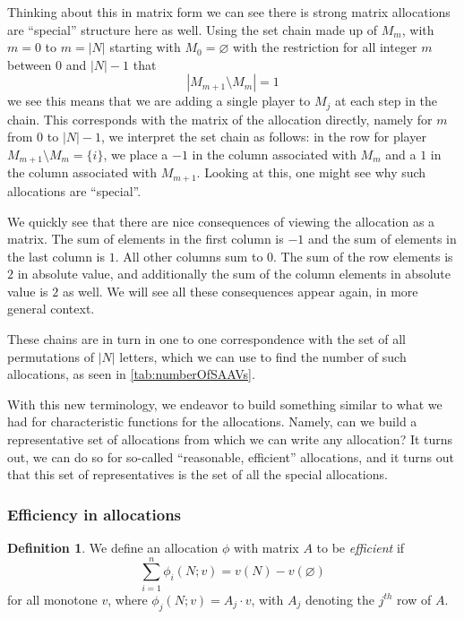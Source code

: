 \documentclass[12pt,letterpaper,final]{article}
\theoremstyle{plain}
\theoremstyle{plain}
\theoremstyle{plain}
\theoremstyle{plain}
\theoremstyle{plain}
\theoremstyle{plain}
\theoremstyle{plain}
\theoremstyle{definition}
\newtheorem{definition}{Definition}[section]
\theoremstyle{definition}
\theoremstyle{definition}
\theoremstyle{definition}
\theoremstyle{definition}
\theoremstyle{remark}
\theoremstyle{remark}
\theoremstyle{remark}
\theoremstyle{remark}
\begin{document}
Thinking about this in matrix form we can see there is strong matrix
allocations are ``special'' structure here as well. Using the set chain
made up of \(M_m\), with \(m=0\) to \(m=|N|\) starting with
\(M_0=\varnothing\) with the restriction for all integer \(m\) between
\(0\) and \(\left|N\right|-1\) that
\[
  \left|M_{m+1}\setminus M_m\right| = 1
\]
we see this means that we are adding a single player to \(M_j\) at
each step in the chain. This corresponds with the matrix of the
allocation directly, namely for \(m\) from \(0\) to
\(\left|N\right|-1\), we interpret the set chain as follows: in the
row for player \(M_{m+1}\setminus M_m =\{i\}\), we place a \(-1\) in
the column associated with \(M_m\) and a \(1\) in the column
associated with \(M_{m+1}\). Looking at this, one might see why such
allocations are ``special''.

We quickly see that there are nice consequences of viewing the
allocation as a matrix.
The sum of elements in the first column is \(-1\) and the sum of
elements in the last column is \(1\). All other columns sum to
\(0\). The sum of the row elements is \(2\) in absolute value, and
additionally the sum of the column elements in absolute value is \(2\)
as well. We will see all these consequences appear again, in more
general context.

These chains are in turn in one to one correspondence with the set of
all permutations of \(|N|\) letters, which we can use to find the
number of such allocations, as seen in \vref{tab:numberOfSAAVs}.

With this new terminology, we endeavor to build something similar to
what we had for characteristic functions for the allocations. Namely,
can we build a representative set of allocations from which we can
write any allocation? It turns out, we can do so for so-called
``reasonable, efficient'' allocations, and it turns out that this
set of representatives  is the set of all the special allocations. 

\subsubsection{Efficiency in allocations}

\begin{definition}\label{def:newEfficiency}
  We define an allocation \(\phi\) with matrix \(A\) to be
  \emph{efficient} if
  \[
    \sum_{i=1}^n \phi_i(N;v) = v(N) -v(\varnothing)
  \]
  for all monotone \(v\), where \(\phi_j(N;v) = A_j \cdot v\), with
  \(A_j\) denoting the \(j^{th}\) row of \(A\).
\end{definition}
\end{document}
